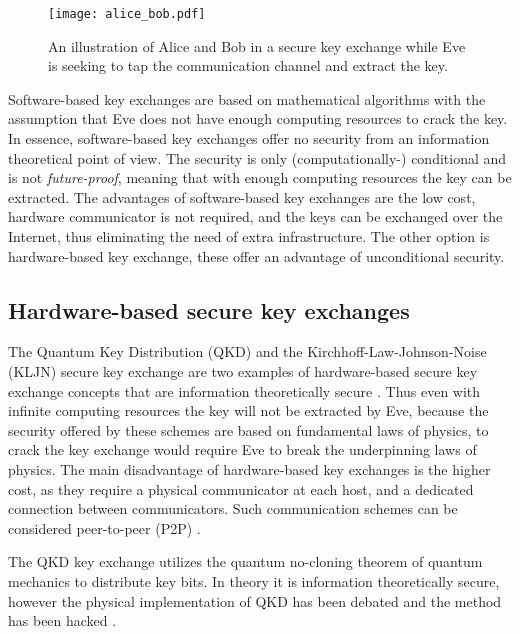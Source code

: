 \documentclass[a4paper,12pt,pdftex]{article}
\begin{document}
\begin{figure}[h]
    \caption{An illustration of Alice and Bob in a secure key exchange while Eve is seeking to tap the communication channel and extract the key.}
    \label{fig:alice_bob}
  \centering
\texttt{[image: alice\_bob.pdf]}
\end{figure}


Software-based key exchanges are based on mathematical algorithms with the assumption that Eve does not have enough computing resources to crack the key. In essence, software-based key exchanges offer no security from an information theoretical point of view. The security is only (computationally-) conditional and is not \textit{future-proof}, meaning that with enough computing resources the key can be extracted. The advantages of software-based key exchanges are the low cost, hardware communicator is not required, and the keys can be exchanged over the Internet, thus eliminating the need of extra infrastructure. The other option is hardware-based key exchange, these offer an advantage of unconditional security. 

\subsection{Hardware-based secure key exchanges}

The Quantum Key Distribution (QKD) \cite{bb84} and the Kirchhoff-Law-Johnson-Noise (KLJN) \cite{kljn1, lk1, lk2, lk3, kljn_its, kljn_noise_properties, kljn_noise_properties2, barry1, barry2, c186, c174, c171, c169, c147, c141, c133, c128, c118, c111, c113, c+6} secure key exchange are two examples of hardware-based secure key exchange concepts that are information theoretically secure \cite{infotheosec}. Thus even with infinite computing resources the key will not be extracted by Eve, because the security offered by these schemes are based on fundamental laws of physics, to crack the key exchange would require Eve to break the underpinning laws of physics. The main disadvantage of hardware-based key exchanges is the higher cost, as they require a physical communicator at each host, and a dedicated connection between communicators. Such communication schemes can be considered peer-to-peer (P2P) \cite{def_p2p}.


The QKD key exchange utilizes the quantum no-cloning theorem of quantum mechanics \cite{bb84} to distribute key bits. In theory it is information theoretically secure, however the physical implementation of QKD has been debated and the method has been hacked \cite{yuen, crack2, crack3, crack4}.
\end{document}
